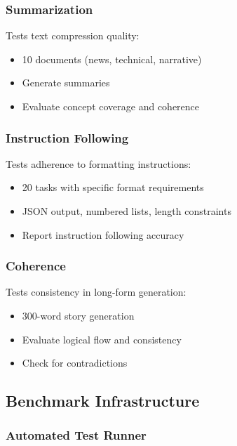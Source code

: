 \subsubsection{Summarization}

Tests text compression quality:

\begin{itemize}
    \item 10 documents (news, technical, narrative)
    \item Generate summaries
    \item Evaluate concept coverage and coherence
\end{itemize}

\subsubsection{Instruction Following}

Tests adherence to formatting instructions:

\begin{itemize}
    \item 20 tasks with specific format requirements
    \item JSON output, numbered lists, length constraints
    \item Report instruction following accuracy
\end{itemize}

\subsubsection{Coherence}

Tests consistency in long-form generation:

\begin{itemize}
    \item 300-word story generation
    \item Evaluate logical flow and consistency
    \item Check for contradictions
\end{itemize}

\subsection{Benchmark Infrastructure}

\subsubsection{Automated Test Runner}

